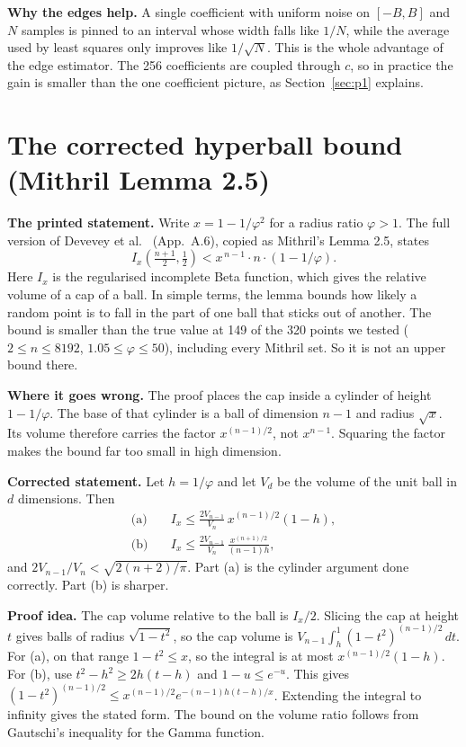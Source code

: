\documentclass[10pt,conference,a4paper]{IEEEtran}
\begin{document}
\textbf{Why the edges help.} A single coefficient with uniform noise on $[-B,B]$ and $N$ samples is pinned to an interval
whose width falls like $1/N$, while the average used by least squares only improves like $1/\sqrt N$. This is the whole
advantage of the edge estimator. The 256 coefficients are coupled through $c$, so in practice the gain is smaller than the
one coefficient picture, as Section~\ref{sec:p1} explains.

\section{The corrected hyperball bound (Mithril Lemma 2.5)}\label{app:a6}
\textbf{The printed statement.} Write $x=1-1/\varphi^2$ for a radius ratio $\varphi>1$. The full version of Devevey et
al.~\cite{devevey} (App.~A.6), copied as Mithril's Lemma 2.5, states
\begin{equation*}
I_x\!\left(\tfrac{n+1}{2},\tfrac12\right) < x^{\,n-1}\cdot n\cdot(1-1/\varphi).
\end{equation*}
Here $I_x$ is the regularised incomplete Beta function, which gives the relative volume of a cap of a ball. In simple
terms, the lemma bounds how likely a random point is to fall in the part of one ball that sticks out of another. The bound
is smaller than the true value at 149 of the 320 points we tested ($2\le n\le 8192$, $1.05\le\varphi\le 50$), including
every Mithril set. So it is not an upper bound there.

\textbf{Where it goes wrong.} The proof places the cap inside a cylinder of height $1-1/\varphi$. The base of that cylinder
is a ball of dimension $n-1$ and radius $\sqrt x$. Its volume therefore carries the factor $x^{(n-1)/2}$, not $x^{n-1}$.
Squaring the factor makes the bound far too small in high dimension.

\textbf{Corrected statement.} Let $h=1/\varphi$ and let $V_d$ be the volume of the unit ball in $d$ dimensions. Then
\begin{align*}
\text{(a)}\quad & I_x \le \tfrac{2V_{n-1}}{V_n}\, x^{(n-1)/2}(1-h),\\
\text{(b)}\quad & I_x \le \tfrac{2V_{n-1}}{V_n}\, \frac{x^{(n+1)/2}}{(n-1)h},
\end{align*}
and $2V_{n-1}/V_n<\sqrt{2(n+2)/\pi}$. Part (a) is the cylinder argument done correctly. Part (b) is sharper.

\textbf{Proof idea.} The cap volume relative to the ball is $I_x/2$. Slicing the cap at height $t$ gives balls of radius
$\sqrt{1-t^2}$, so the cap volume is $V_{n-1}\int_h^1(1-t^2)^{(n-1)/2}\,dt$. For (a), on that range $1-t^2\le x$, so the
integral is at most $x^{(n-1)/2}(1-h)$. For (b), use $t^2-h^2\ge 2h(t-h)$ and $1-u\le e^{-u}$. This gives
$(1-t^2)^{(n-1)/2}\le x^{(n-1)/2}e^{-(n-1)h(t-h)/x}$. Extending the integral to infinity gives the stated form. The bound
on the volume ratio follows from Gautschi's inequality for the Gamma function.
\end{document}
